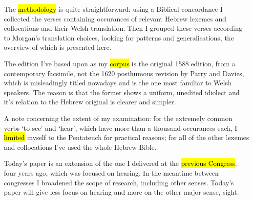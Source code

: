 \begin{paper}
	{\click} The \hl{methodology} is quite straightforward:  using a Biblical concordance I collected the verses containing occurances of relevant Hebrew lexemes and collocations and their Welsh translation.  Then I grouped these verses according to Morgan’s translation choices,  looking for patterns and generalisations, the overview of which is presented here.

	\begin{leftbar}
		{\click} The edition I’ve based upon as my \hl{corpus} is the original 1588 edition, from a contemporary facsimile, not the 1620 posthumous revision by Parry and Davies, which is misleadingly titled  nowadays and is the one most familiar to Welsh speakers. The reason is that the former shows a uniform, unedited idiolect and it’s relation to the Hebrew original is clearer and simpler.
	\end{leftbar}

	{\click} A note concerning the extent of my examination: for the extremely common verbs  ‘to see’ and  ‘hear’, which have more than a thousand occurances each, I \hl{limited} myself to the Pentateuch for practical reasons; for all of the other lexemes and collocations I’ve used the whole Hebrew Bible.

	{\click} Today’s paper is an extension of the one I delivered at the \hl{previous Congress}, four years ago, which was focused on hearing. In the meantime between congresses I broadened the scope of research, including other senses. Today’s paper will give less focus on hearing and more on the other major sense, sight.
\end{paper}
